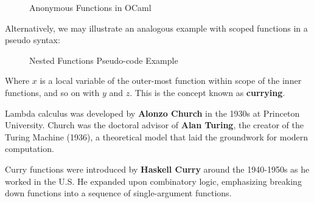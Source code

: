 \begin{figure}[h]
    {
    \setlength{\fboxsep}{16pt}
    \centering
    }
    \caption{Anonymous Functions in OCaml}
    
    \label{fig:ocaml-anon}
\end{figure}

\vspace{-1em}
\noindent
Alternatively, we may illustrate an analogous example with scoped functions in a pseudo syntax:

\begin{figure}[h]
    {
    \setlength{\fboxsep}{0pt}
    \centering
    }
    \caption{Nested Functions Pseudo-code Example}
    
    \label{fig:ocaml-anon2}
\end{figure}

\vspace{-.5em}
\noindent
Where $x$ is a local variable of the outer-most function within scope of the inner functions, and so on with $y$ and $z$.
This is the concept known as \textbf{currying}.

\begin{Tip}
    Lambda calculus was developed by \textbf{Alonzo Church} in the 1930s at Princeton University. Church was the doctoral advisor of \textbf{Alan Turing}, the creator of the Turing Machine (1936), a theoretical model that laid the groundwork for modern computation.
    
    Curry functions were introduced by \textbf{Haskell Curry} around the 1940-1950s as he worked in the U.S. He expanded upon combinatory logic, emphasizing breaking down functions into a sequence of single-argument functions.
\end{Tip}
    


